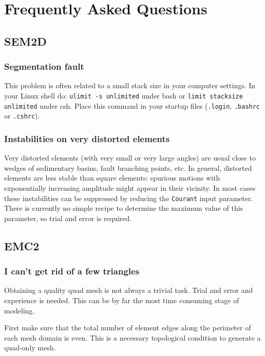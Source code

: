 \chapter{Frequently Asked Questions}
\label{Cha:faq}

\section{SEM2D}
\label{faq_sem2d}

\subsection*{Segmentation fault}

This problem is often related to a small stack size in your computer settings.
In your Linux shell do: \texttt{ulimit -s unlimited} under bash
or \texttt{limit stacksize unlimited} under csh.
Place this command in your startup files (\texttt{.login}, \texttt{.bashrc} or \texttt{.cshrc}).

\subsection*{Instabilities on very distorted elements}

Very distorted elements (with very small or very large angles) 
are usual close to wedges of sedimentary basins, fault branching points, etc.
In general, distorted elements are less stable than square elements:
spurious motions with exponentially increasing amplitude might appear in their vicinity.
In most cases these instabilities can be suppressed by reducing the \texttt{Courant} input parameter.
There is currently no simple recipe to determine the maximum value of this parameter,
so trial and error is required.

\section{EMC2}
\label{faq_emc2}

\subsection*{I can't get rid of a few triangles}

Obtaining a quality quad mesh is not always a trivial task. Trial and error and experience
is needed. This can be by far the most time consuming stage of modeling.

First make sure that the total number of element edges
along the perimeter of each mesh domain is even. This is a necessary
topological condition to generate a quad-only mesh. 

